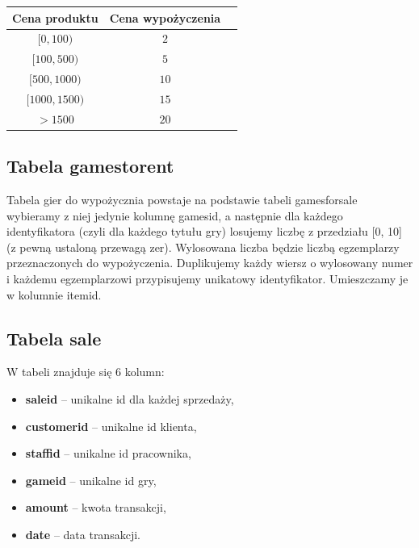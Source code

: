 \documentclass{article}
\begin{document}
	\begin{center}\centering
		\begin{tabular}{|c|c|c|}
			\hline
			\textbf{Cena produktu} & \textbf{Cena wypożyczenia}\\
			\hline
			$[0, 100)$ & $2$\\
			\hline
			$[100, 500)$ & $5$\\
			\hline
			$[500, 1000)$ & $10$\\
			\hline
			$[1000, 1500)$ & $15$\\
			\hline
			$>1500$ & $20$\\
			\hline
		\end{tabular}
	\end{center}
	
	
	
	\subsection{Tabela games\textunderscore to\textunderscore rent}
	Tabela gier do wypożycznia powstaje na podstawie tabeli games\textunderscore for\textunderscore sale wybieramy z niej jedynie kolumnę games\textunderscore id, a następnie dla każdego identyfikatora (czyli dla każdego tytułu gry) losujemy liczbę z przedziału [0, 10] (z pewną ustaloną przewagą zer). Wylosowana liczba będzie liczbą egzemplarzy przeznaczonych do wypożyczenia. Duplikujemy każdy wiersz o wylosowany numer i każdemu egzemplarzowi przypisujemy unikatowy identyfikator. Umieszczamy je w kolumnie item\textunderscore id.
	
	\subsection{Tabela sale}
		W tabeli znajduje się 6 kolumn:
		\begin{itemize}
			\setlength{\itemsep}{-2pt}
			\item \textbf{sale\textunderscore id} – unikalne id dla każdej sprzedaży,
			\item \textbf{customer\textunderscore id} – unikalne id klienta,
			\item \textbf{staff\textunderscore id} – unikalne id pracownika,
			\item \textbf{game\textunderscore id} – unikalne id gry,
			\item \textbf{amount} – kwota transakcji,
			\item \textbf{date} – data transakcji.
		\end{itemize}
\end{document}
